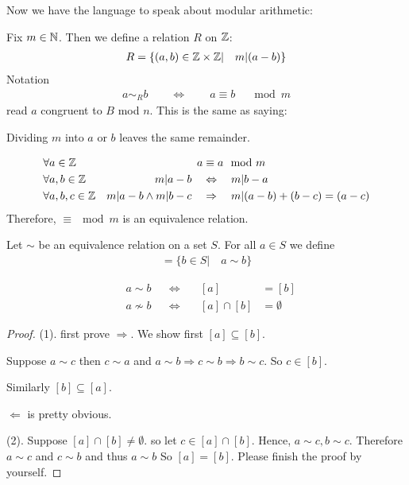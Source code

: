 Now we have the language to speak about modular arithmetic:


Fix $m \in \mathbb N$. Then we define a relation $R$ on $\mathbb Z$:
\begin{align*}
R = \{ (a,b) \in \mathbb Z \times \mathbb Z| \quad m|(a-b) \}
\end{align*}
Notation
\begin{align*}
a \sim_R b \qquad \Leftrightarrow \qquad a \equiv b \quad \mod m
\end{align*}
read $a$ congruent to $B$ mod $n$. This is the same as saying:

Dividing $m$ into $a$ or $b$ leaves the same remainder.

\begin{pr}
\begin{align*}
& \forall a \in \mathbb Z & a & \equiv a \mod m \\
& \forall a,b \in \mathbb Z & m |a-b \quad & \Leftrightarrow \quad m |b-a \\
& \forall a,b,c \in \mathbb Z & m|a-b \wedge m|b-c \quad & \Rightarrow  \quad m |(a-b) + (b-c) = (a-c)
\end{align*}
Therefore, $\equiv \mod m$ is an equivalence relation.
\end{pr}

\begin{df}
Let $\sim$ be an equivalence relation on a set $S$. For all $a \in S$ we define 
\begin{align*}
[a] = \{ b \in S| \quad a \sim b \}
\end{align*}
\end{df}

\begin{tm}
\begin{align*}
& a \sim b  & & \Leftrightarrow & \quad [a] & =[b] \tag{1}\\
& a \nsim b & & \Leftrightarrow & \quad [a] \cap [b] & = \emptyset \tag{2}
\end{align*}
\end{tm}
\begin{proof}
(1). first prove $ \Rightarrow$. We show first $[a] \subseteq [b]$.

Suppose $a \sim c$ then $c \sim a$ and $a \sim b \Rightarrow c \sim b \Rightarrow b \sim c$. So $c \in [b]$.

Similarly $[b] \subseteq[a]$. 

$\Leftarrow$ is pretty obvious.

(2). Suppose $[a]\cap [b] \neq \emptyset$. so let $c \in [a] \cap [b]$. Hence, $a \sim c, b \sim c$. Therefore $a \sim c $ and $c \sim b$ and thus $ a \sim b$
So $[a] = [b]$. Please finish the proof by yourself.
\end{proof}

